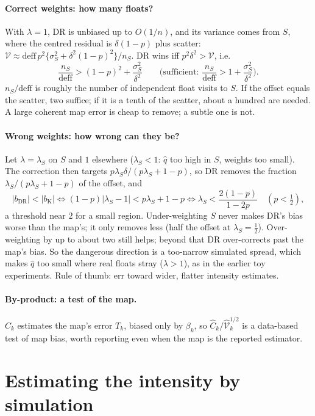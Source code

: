 \paragraph{Correct weights: how many floats?} With $\lambda=1$, DR is unbiased up to $O(1/n)$, and its
variance comes from $S$, where the centred residual is $\delta(1-p)$ plus scatter:
$\mathcal V\approx\mathrm{deff}\,p^2\{\sigma_S^2+\delta^2(1-p)^2\}/n_S$. DR wins iff $p^2\delta^2>\mathcal V$, i.e.
\[
  \frac{n_S}{\mathrm{deff}}>(1-p)^2+\frac{\sigma_S^2}{\delta^2}
  \qquad\Big(\text{sufficient: }\frac{n_S}{\mathrm{deff}}>1+\frac{\sigma_S^2}{\delta^2}\Big).
\]
$n_S/\mathrm{deff}$ is roughly the number of independent float visits to $S$. If the offset equals the
scatter, two suffice; if it is a tenth of the scatter, about a hundred are needed. A large coherent map
error is cheap to remove; a subtle one is not.

\paragraph{Wrong weights: how wrong can they be?} Let $\lambda=\lambda_S$ on $S$ and $1$ elsewhere
($\lambda_S<1$: $\hat q$ too high in $S$, weights too small). The correction then targets
$p\lambda_S\delta/(p\lambda_S+1-p)$, so DR removes the fraction $\lambda_S/(p\lambda_S+1-p)$ of the
offset, and
\[
  |b_{\mathrm{DR}}|<|b_{\mathrm K}|\iff(1-p)|\lambda_S-1|<p\lambda_S+1-p\iff\lambda_S<\frac{2(1-p)}{1-2p}
  \quad(p<\tfrac12),
\]
a threshold near $2$ for a small region. Under-weighting $S$ never makes DR's bias worse than the map's;
it only removes less (half the offset at $\lambda_S=\tfrac12$). Over-weighting by up to about two still
helps; beyond that DR over-corrects past the map's bias. So the dangerous direction is a too-narrow simulated spread, which makes $\hat q$ too small where real
floats stray ($\lambda>1$), as in the earlier toy experiments. Rule of thumb: err toward wider, flatter intensity estimates.

\paragraph{By-product: a test of the map.} $\hat C_k$ estimates the map's error $T_k$, biased only
by $\beta_k$, so $\hat C_k/\hat{\mathcal V}_k^{1/2}$ is a data-based test of map bias, worth reporting
even when the map is the reported estimator.

\section{Estimating the intensity by simulation}\label{sec:qhat}

